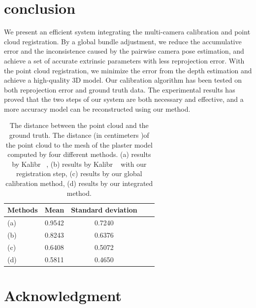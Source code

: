 \documentclass{article}
\begin{document}
\section{conclusion}
We present an efficient system integrating the multi-camera calibration and point cloud registration. By a global bundle adjustment, we reduce the accumulative error and the inconsistence caused by the pairwise camera pose estimation, and achieve a set of accurate extrinsic parameters with less reprojection error. With the point cloud registration, we minimize the error from the depth estimation and achieve a high-quality 3D model. Our calibration algorithm has been tested on both reprojection error and ground truth data. The experimental results has proved that the two steps of our system are both necessary and effective, and a more accuracy model can be reconstructed using our method.
\begin{table}
	\centering
	\caption{The distance between the point cloud and the ground truth. The distance (in centimeters )of the point cloud to the mesh of the plaster model computed by four different methods. (a) results by Kalibr ~\cite{Maye2013Self}, (b) results by Kalibr ~\cite{Maye2013Self} with our registration step, (c) results by our global calibration method, (d) results by our integrated method.}
	\label{tab:distance}
	\begin{tabular}{lcccc}
		\hline
		Methods & Mean &Standard deviation\\
		\hline
		(a) &0.9542 &0.7240\\

		(b) &0.8243 &0.6376\\
		
		(c) &0.6408 &0.5072\\
		
		(d) &0.5811 &0.4650\\
		\hline
		
	\end{tabular}
\label{fig:distance}
\end{table}

\section{Acknowledgment}




\end{document}
